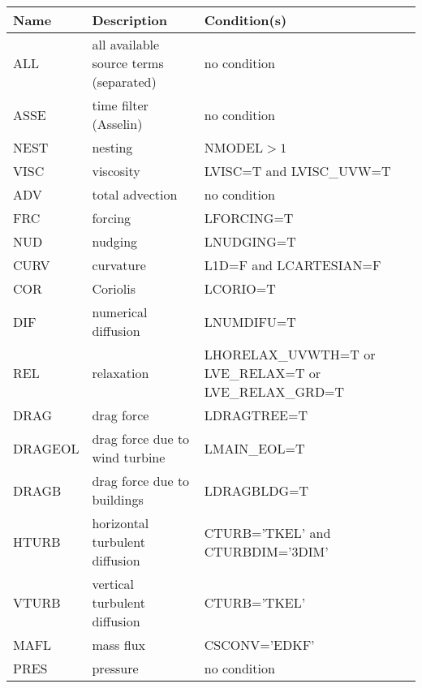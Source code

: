\begin{longtable} {|p{}|p{}|p{}|}
\hline
Name & Description & Condition(s) \\
\hline \hline
\endhead
ALL     & all available source terms (separated) & no condition \\\hline \hline
ASSE    & time filter (Asselin)          & no condition                     \\\hline
NEST    & nesting                        & NMODEL$>1$                       \\\hline
VISC    & viscosity                      & LVISC=T and LVISC\_UVW=T         \\\hline
ADV     & total advection                & no condition                     \\\hline
FRC     & forcing                        & LFORCING=T                       \\\hline
NUD     & nudging                        & LNUDGING=T                       \\\hline
CURV    & curvature                      & L1D=F and LCARTESIAN=F           \\\hline
COR     & Coriolis                       & LCORIO=T                         \\\hline
DIF     & numerical diffusion            & LNUMDIFU=T                       \\\hline
REL     & relaxation                     & LHORELAX\_UVWTH=T or LVE\_RELAX=T or LVE\_RELAX\_GRD=T \\\hline
DRAG    & drag force                     & LDRAGTREE=T                      \\\hline
DRAGEOL & drag force due to wind turbine & LMAIN\_EOL=T                     \\\hline
DRAGB   & drag force due to buildings    & LDRAGBLDG=T                      \\\hline
HTURB   & horizontal turbulent diffusion & CTURB='TKEL' and CTURBDIM='3DIM' \\\hline
VTURB   & vertical turbulent diffusion   & CTURB='TKEL'                     \\\hline
MAFL    & mass flux                      & CSCONV='EDKF'                    \\\hline
PRES    & pressure                       & no condition                     \\\hline
\end{longtable}


